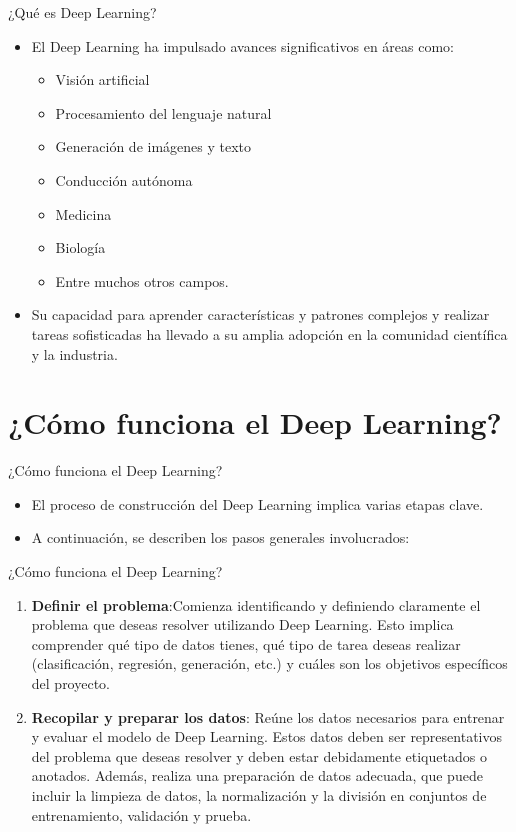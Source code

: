 \documentclass[11pt,aspectratio=169]{beamer}
\begin{document}
\begin{frame}{¿Qué es Deep Learning?}
	\begin{itemize}
		\item El Deep Learning ha impulsado avances significativos en áreas como: \pause 
			\begin{itemize}
				\item Visión artificial\pause 
				\item Procesamiento del lenguaje natural \pause
				\item Generación de imágenes y texto \pause
				\item Conducción autónoma \pause
				\item Medicina \pause 
				\item Biología \pause 
				\item Entre muchos otros campos.\pause 
			\end{itemize} 
		\item Su capacidad para aprender características y patrones complejos y realizar tareas sofisticadas ha llevado a su amplia 
			adopción en la comunidad científica y la industria.
	\end{itemize}
\end{frame}

\section{¿Cómo funciona el Deep Learning?}
\begin{frame}{¿Cómo funciona el Deep Learning?}
	\begin{itemize}
		\item El proceso de construcción del Deep Learning implica varias etapas clave.\pause 
		\item A continuación, se describen los pasos generales involucrados:
	\end{itemize}
\end{frame}

\begin{frame}{¿Cómo funciona el Deep Learning?}
	\begin{enumerate}
		\item \textbf{Definir el problema}:\pause Comienza identificando y definiendo claramente el problema que deseas resolver utilizando Deep Learning. \pause
			Esto implica comprender qué tipo de datos tienes, qué tipo de tarea deseas realizar (clasificación, regresión, generación, etc.) 
			y cuáles son los objetivos específicos del proyecto.\pause
		\item \textbf{Recopilar y preparar los datos}: Reúne los datos necesarios para entrenar y evaluar el modelo de Deep Learning.\pause 
			Estos datos deben ser representativos del problema que deseas resolver y deben estar debidamente etiquetados o anotados.\pause 
			Además, realiza una preparación de datos adecuada, que puede incluir la limpieza de datos, la normalización y la división en 
			conjuntos de entrenamiento, validación y prueba.\pause
	\end{enumerate}
\end{frame}
\end{document}
